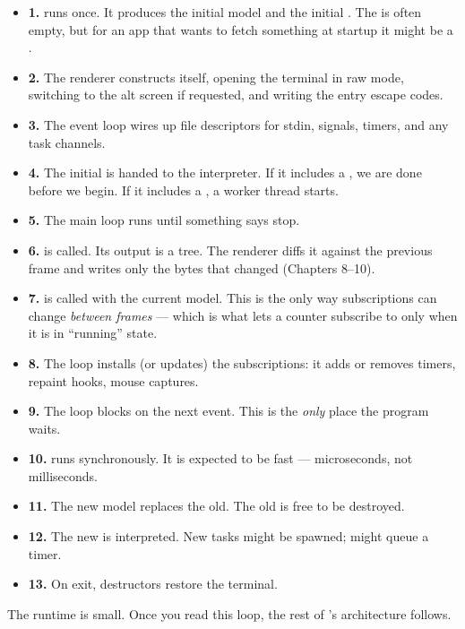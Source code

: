 \begin{itemize}[leftmargin=*]
  \item \textbf{1.}  runs once. It produces the initial
    model and the initial . The  is often
    empty, but for an app that wants to fetch something at startup
    it might be a .
  \item \textbf{2.} The renderer constructs itself, opening the
    terminal in raw mode, switching to the alt screen if
    requested, and writing the entry escape codes.
  \item \textbf{3.} The event loop wires up file descriptors for
    stdin, signals, timers, and any task channels.
  \item \textbf{4.} The initial  is handed to the
    interpreter. If it includes a , we are done before
    we begin. If it includes a , a worker thread
    starts.
  \item \textbf{5.} The main loop runs until something says stop.
  \item \textbf{6.}  is called. Its output is a tree.
    The renderer diffs it against the previous frame and writes
    only the bytes that changed (Chapters 8--10).
  \item \textbf{7.}  is called with the current
    model. This is the only way subscriptions can change
    \emph{between frames} --- which is what lets a counter
    subscribe to  only when it is in ``running''
    state.
  \item \textbf{8.} The loop installs (or updates) the
    subscriptions: it adds or removes timers, repaint hooks, mouse
    captures.
  \item \textbf{9.} The loop blocks on the next event. This is
    the \emph{only} place the program waits.
  \item \textbf{10.}  runs synchronously. It is
    expected to be fast --- microseconds, not milliseconds.
  \item \textbf{11.} The new model replaces the old. The old is
    free to be destroyed.
  \item \textbf{12.} The new  is interpreted. New tasks
    might be spawned;  might queue a timer.
  \item \textbf{13.} On exit, destructors restore the terminal.
\end{itemize}

The runtime is small. Once you read this loop, the rest of
\maya{}'s architecture follows.

